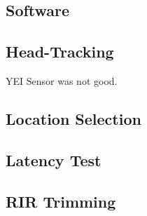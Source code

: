 \documentclass[../../main.tex]{subfiles}
\begin{document}
	\subsection{Software}

	\subsection{Head-Tracking}
		YEI Sensor was not good.
	\subsection{Location Selection}

	\subsection{Latency Test}
	
	\subsection{RIR Trimming}
\end{document}
